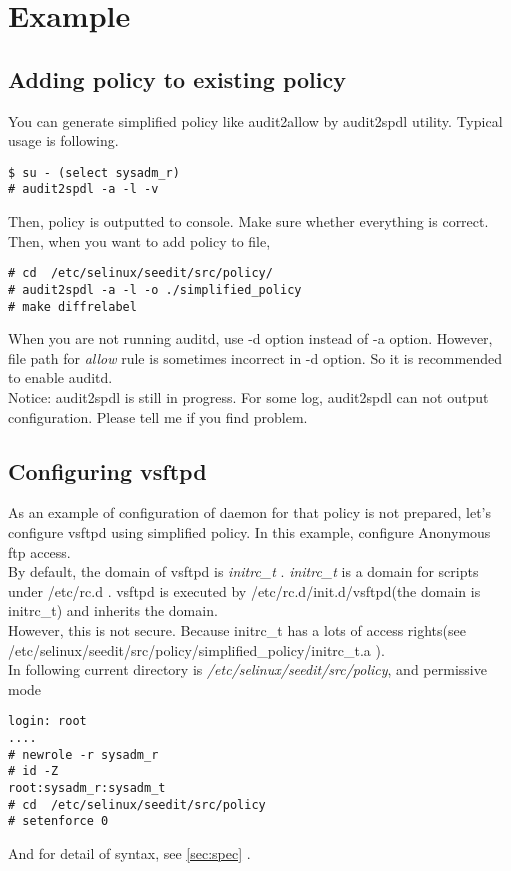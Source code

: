 \section{Example}
\subsection{Adding policy to existing policy}
You can generate simplified policy like audit2allow by audit2spdl utility.
Typical usage is following.\\
\begin{verbatim}
$ su - (select sysadm_r)
# audit2spdl -a -l -v
\end{verbatim}
Then, policy is outputted to console. 
Make sure whether everything is correct.
Then, when you want to add policy to file,
\begin{verbatim}
# cd  /etc/selinux/seedit/src/policy/
# audit2spdl -a -l -o ./simplified_policy
# make diffrelabel
\end{verbatim}
When you are not running auditd, use -d option instead of -a option.
However, file path for {\it allow} rule is sometimes incorrect in -d
option. So it is recommended to enable auditd. \\
Notice: audit2spdl is still in progress. For some log, audit2spdl can
not output configuration. Please tell me if you find problem.

\subsection{Configuring vsftpd}
As an example of configuration of daemon for that policy is not
prepared,  let's configure vsftpd using
simplified policy. In this example, configure Anonymous ftp access.\\
By default, the domain of vsftpd is {\it initrc\_t }.
{\it initrc\_t } is a domain for scripts under /etc/rc.d . vsftpd
is executed by /etc/rc.d/init.d/vsftpd(the domain is initrc\_t) and
inherits the domain.\\ 
However, this is not secure. Because initrc\_t has a lots of access
rights(see /etc/selinux/seedit/src/policy/simplified\_policy/initrc\_t.a
).\\
In following current directory is {\it
/etc/selinux/seedit/src/policy}, and permissive mode\\
\begin{verbatim}
login: root
....
# newrole -r sysadm_r
# id -Z
root:sysadm_r:sysadm_t
# cd  /etc/selinux/seedit/src/policy
# setenforce 0
\end{verbatim}
And for detail of syntax, see \ref{sec:spec} .

